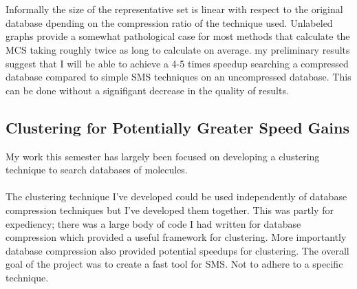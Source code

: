 \documentclass[DIV=calc, paper=a4, fontsize=12pt, twocolumn]{scrartcl}	 %
\begin{document}
\\\\
Informally the size of the representative set is linear with respect to the original database dpending on the compression ratio of the technique used. Unlabeled graphs provide a somewhat pathological case for most methods that calculate the MCS taking roughly twice as long to calculate on average. my preliminary results suggest that I will be able to achieve a 4-5 times speedup searching a compressed database compared to simple SMS techniques on an uncompressed database. This can be done without a signifigant decrease in the quality of results.
\subsection*{Clustering for Potentially Greater Speed Gains}
My work this semester has largely been focused on developing a clustering technique to search databases of molecules. 
\\\\
The clustering technique I've developed could be used independently of database compression techniques but I've developed them together. This was partly for expediency; there was a large body of code I had written for database compression which provided a useful framework for clustering. More importantly database compression also provided potential speedups for clustering. The overall goal of the project was to create a fast tool for SMS. Not to adhere to a specific technique. 
\end{document}

